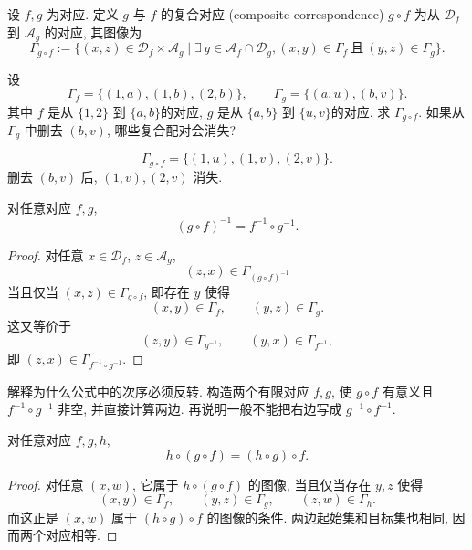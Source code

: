 \documentclass[usesamecnt, thmcnt=section, lang=cn, newtx, 10pt, scheme=chinese]{elegantbook}
\begin{document}
\begin{definition}\label{def:corr-composition}
设 $f,g$ 为对应. 定义 $g$ 与 $f$ 的{\color{blue}复合对应 (composite correspondence)} $g\circ f$ 为从 $\mathscr D_f$ 到 $\mathscr A_g$ 的对应, 其图像为
\[
 \Gamma_{g\circ f}
 :=\{(x,z)\in\mathscr D_f\times\mathscr A_g\mid
 \exists\,y\in\mathscr A_f\cap\mathscr D_g,
 (x,y)\in\Gamma_f\ \text{且}\ (y,z)\in\Gamma_g\}.
\]
\end{definition}

\begin{concept}\label{con:corr-06}
设
\[
 \Gamma_f=\{(1,a),(1,b),(2,b)\},
 \qquad
 \Gamma_g=\{(a,u),(b,v)\}.
\]
其中 $f$ 是从 $\{1,2\}$ 到 $\{a,b\}$的对应, $g$ 是从 $\{a,b\}$ 到 $\{u,v\}$的对应. 求 $\Gamma_{g\circ f}$. 如果从 $\Gamma_g$ 中删去 $(b,v)$, 哪些复合配对会消失?
\end{concept}

\begin{solution}
\[
 \Gamma_{g\circ f}=\{(1,u),(1,v),(2,v)\}.
\]
删去 $(b,v)$ 后, $(1,v),(2,v)$ 消失.
\end{solution}

\begin{proposition}\label{prop:corr-inverse-composition}
对任意对应 $f,g$,
\[
 (g\circ f)^{-1}=f^{-1}\circ g^{-1}.
\]
\end{proposition}

\begin{proof}
对任意 $x\in\mathscr D_f$, $z\in\mathscr A_g$,
\[
 (z,x)\in\Gamma_{(g\circ f)^{-1}}
\]
当且仅当 $(x,z)\in\Gamma_{g\circ f}$, 即存在 $y$ 使得
\[
 (x,y)\in\Gamma_f,
 \qquad
 (y,z)\in\Gamma_g.
\]
这又等价于
\[
 (z,y)\in\Gamma_{g^{-1}},
 \qquad
 (y,x)\in\Gamma_{f^{-1}},
\]
即 $(z,x)\in\Gamma_{f^{-1}\circ g^{-1}}$.
\end{proof}

\begin{exercise}\label{ex:corr-inverse-composition}
解释为什么公式中的次序必须反转. 构造两个有限对应 $f,g$, 使 $g\circ f$ 有意义且 $f^{-1}\circ g^{-1}$ 非空, 并直接计算两边. 再说明一般不能把右边写成 $g^{-1}\circ f^{-1}$.
\end{exercise}

\begin{proposition}\label{prop:corr-associativity}
对任意对应 $f,g,h$,
\[
 h\circ(g\circ f)=(h\circ g)\circ f.
\]
\end{proposition}

\begin{proof}
对任意 $(x,w)$, 它属于 $h\circ(g\circ f)$ 的图像, 当且仅当存在 $y,z$ 使得
\[
 (x,y)\in\Gamma_f,
 \qquad
 (y,z)\in\Gamma_g,
 \qquad
 (z,w)\in\Gamma_h.
\]
而这正是 $(x,w)$ 属于 $(h\circ g)\circ f$ 的图像的条件. 两边起始集和目标集也相同, 因而两个对应相等.
\end{proof}
\end{document}
